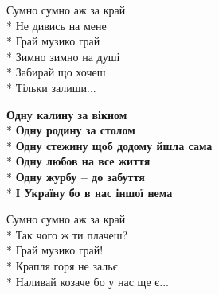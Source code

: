\medskip

\begin{minipage}{\linewidth}
Сумно сумно аж за край\\*
Не дивись на мене\\*
Грай музико грай\\*
Зимно зимно на душі\\*
Забирай що хочеш\\*
Тільки залиши...\\
\end{minipage}\par\medskip\nobreak

\medskip

\begin{minipage}{\linewidth}
\hspace*{1.5em}\textbf{Одну калину за вікном}\\*
\hspace*{1.5em}\textbf{Одну родину за столом}\\*
\hspace*{1.5em}\textbf{Одну стежину щоб додому йшла сама}\\*
\hspace*{1.5em}\textbf{Одну любов на все життя}\\*
\hspace*{1.5em}\textbf{Одну журбу – до забуття}\\*
\hspace*{1.5em}\textbf{І Україну бо в нас іншої нема}\\
\end{minipage}\par\medskip\nobreak

\medskip

\begin{minipage}{\linewidth}
Сумно сумно аж за край\\*
Так чого ж ти плачеш?\\*
Грай музико грай!\\*
Крапля горя не зальє\\*
Наливай козаче бо у нас ще є...\\
\end{minipage}\par\medskip\nobreak

\medskip

